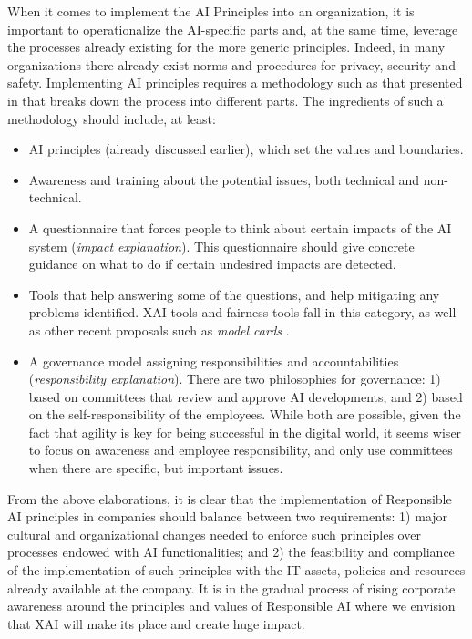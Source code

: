 \documentclass[final]{elsarticle}
\begin{document}
When it comes to implement the AI Principles into an organization, it is important to operationalize the AI-specific parts and, at the same time, leverage the processes already existing for the more generic principles. Indeed, in many organizations there already exist norms and procedures for privacy, security and safety. Implementing AI principles requires a methodology such as that presented in \cite{benjamins2019responsible} that breaks down the process into different parts. The ingredients of such a methodology should include, at least:
\begin{itemize}[leftmargin=*]
\item AI principles (already discussed earlier), which set the values and boundaries.
\item Awareness and training about the potential issues, both technical and non-technical.
\item A questionnaire that forces people to think about certain impacts of the AI system {\color{black}(\emph{impact explanation})}. This questionnaire should give concrete guidance on what to do if certain undesired impacts are detected.
\item Tools that help answering some of the questions, and help mitigating any problems identified. XAI tools and fairness tools fall in this category{\color{black}, as well as other recent proposals such as \emph{model cards} \cite{mitchell2019model}.}
\item A governance model assigning responsibilities and accountabilities {\color{black}(\emph{responsibility explanation})}. There are two philosophies for governance: 1) based on committees that review and approve AI developments, and 2) based on the self-responsibility of the employees. While both are possible, given the fact that agility is key for being successful in the digital world, it seems wiser to focus on awareness and employee responsibility, and only use committees when there are specific, but important issues.
\end{itemize}

From the above elaborations, it is clear that the implementation of Responsible AI principles in companies should balance between two requirements: 1) major cultural and organizational changes needed to enforce such principles over processes endowed with AI functionalities; and 2) the feasibility and compliance of the implementation of such principles with the IT assets, policies and resources already available at the company. It is in the gradual process of rising corporate awareness around the principles and values of Responsible AI where we envision that XAI will make its place and create huge impact.
\end{document}
